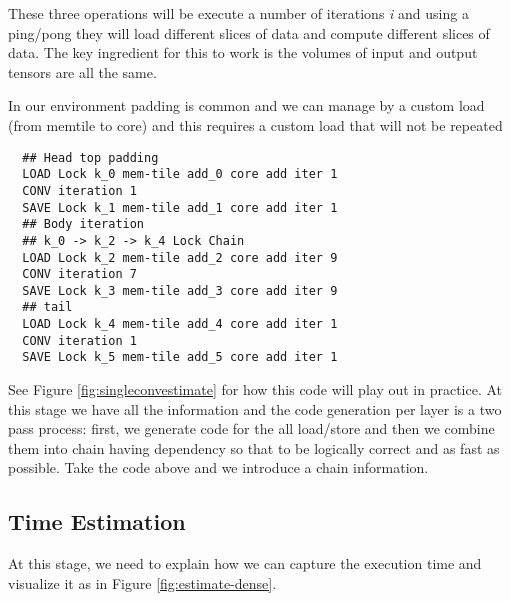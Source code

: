 \documentclass[conference]{IEEEtran}
\begin{document}
These three operations will be execute a number of iterations {\em i}
and using a ping/pong they will load different slices of data and
compute different slices of data. The key ingredient for this to work
is the volumes of input and output tensors are all the same. 


In our environment padding is common and we can manage by a custom
load (from memtile to core) and this requires a custom load that will
not be repeated
{\footnotesize
\begin{verbatim}
  ## Head top padding
  LOAD Lock k_0 mem-tile add_0 core add iter 1
  CONV iteration 1
  SAVE Lock k_1 mem-tile add_1 core add iter 1
  ## Body iteration
  ## k_0 -> k_2 -> k_4 Lock Chain
  LOAD Lock k_2 mem-tile add_2 core add iter 9
  CONV iteration 7
  SAVE Lock k_3 mem-tile add_3 core add iter 9
  ## tail
  LOAD Lock k_4 mem-tile add_4 core add iter 1
  CONV iteration 1
  SAVE Lock k_5 mem-tile add_5 core add iter 1
\end{verbatim}
 } See Figure \ref{fig:singleconvestimate} for how this code will play
out in practice. At this stage we have all the information and the
code generation per layer is a two pass process: first, we generate
code for the all load/store and then we combine them into chain having
dependency so that to be logically correct and as fast as
possible. Take the code above and we introduce a chain information.


\newpage 
{}


\subsection{Time Estimation}
At this stage, we need to explain how we can capture the execution
time and visualize it as in Figure \ref{fig:estimate-dense}.
\end{document}

